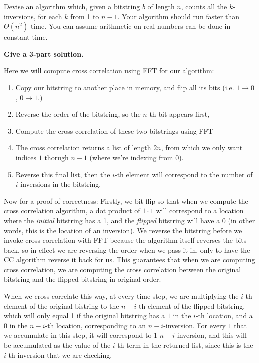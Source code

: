 \documentclass[11pt]{article}
\begin{document}
Devise an algorithm which, given a bitstring $b$ of length $n$, counts all the $k$-inversions, for each $k$ from 1 to $n-1$. Your algorithm should run faster than $\Theta(n^2)$ time. You can assume arithmetic on real numbers can be done in constant time.

\textbf{Give a 3-part solution.}

\begin{solution}
	Here we will compute cross correlation using FFT for our algorithm: 
	\begin{enumerate}
		\item Copy our bitstring to another place in memory, and flip all its bits (i.e. $1 \to 0$, $0 \to 1$.)
		\item Reverse the order of the bitstring, so the $n$-th bit appears first, 
		\item Compute the cross correlation of these two bitstrings using FFT 
		\item The cross correlation returns a list of length $2n$, from which we only want indices $1$ thorugh 
			$n-1$ (where we're indexing from 0).
		\item Reverse this final list, then the $i$-th element will correspond to the number of $i$-inversions
			in the bitstring. 
	\end{enumerate}
	Now for a proof of correctness: Firstly, we bit flip so that when we compute the cross correlation algorithm,
	a dot product of $1 \cdot 1$ will correspond to a location where the \textit{initial} bitstring has a 1, 
	and the \textit{flipped} bitstring will have a 0 (in other words, this is the location of an inversion). We
	reverse the bitstring before we invoke cross correlation with FFT because the algorithm itself reverses
	the bits back, so in effect we are reversing the order when we pass it in, only to have the CC algorithm 
	reverse it back for us. This guarantees that when we are computing cross correlation, we are computing 
	the cross correlation between the original bitstring and the flipped bitstring
	in original order.

	When we cross correlate this way, at every time step, we are multiplying the $i$-th element of the original
	bistring to the $n-i$-th element of the flipped bitstring, which will only equal 1 if the original bitstring
	has a $1$ in the $i$-th location, and a 0 in the $n-i$-th location, corresponding to an $n-i$-inversion. 
	For every $1$ that we accumulate in this step, it will correspond to 1 $n-i$ inversion, and this will 
	be accumulated as the value of the $i$-th term in the returned list, since this is the $i$-th inversion 
	that we are checking.


\end{solution}
\end{document}

